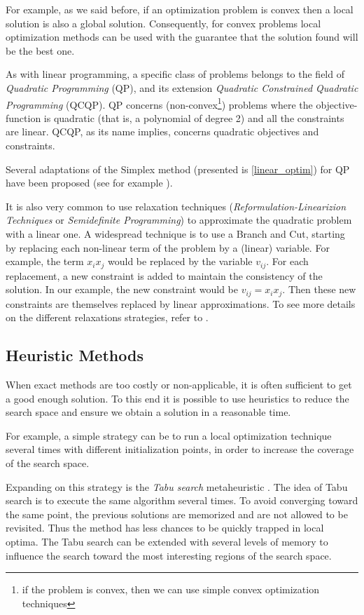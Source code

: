 For example, as we said before, if an optimization problem is convex then a local solution is also a global solution. Consequently, for convex problems local optimization methods can be used with the guarantee that the solution found will be the best one.

As with linear programming, a specific class of problems belongs to the field of \emph{Quadratic Programming} (QP), and its extension \emph{Quadratic Constrained Quadratic Programming} (QCQP). QP concerns (non-convex\footnote{if the problem is convex, then we can use simple convex optimization techniques}) problems where the objective-function is quadratic (that is, a polynomial of degree 2) and all the constraints are linear. QCQP, as its name implies, concerns quadratic objectives and constraints.

Several adaptations of the Simplex method (presented is \ref{linear_optim}) for QP have been proposed (see for example \cite{wolfe1959simplex, dantzig1998linear, van1964simplicial}).

It is also very common to use relaxation techniques (\emph{Reformulation-Linearizion Techniques} or \emph{Semidefinite Programming}) to approximate the quadratic problem with a linear one. A widespread technique is to use a Branch and Cut, starting by replacing each non-linear term of the problem by a (linear) variable. For example, the term $x_ix_j$ would be replaced by the variable $v_{ij}$. For each replacement, a new constraint is added to maintain the consistency of the solution. In our example, the new constraint would be $v_{ij} = x_ix_j$. Then these new constraints are themselves replaced by linear approximations.
To see more details on the different relaxations strategies, refer to \cite{audet2000branch}.

\subsection{Heuristic Methods}\label{optim_heuristic}

When exact methods are too costly or non-applicable, it is often sufficient to get a good enough solution. To this end it is possible to use heuristics to reduce the search space and ensure we obtain a solution in a reasonable time.

For example, a simple strategy can be to run a local optimization technique several times with different initialization points, in order to increase the coverage of the search space.

Expanding on this strategy is the \emph{Tabu search} metaheuristic \cite{glover1989tabu}. The idea of Tabu search is to execute the same algorithm several times. To avoid converging toward the same point, the previous solutions are memorized and are not allowed to be revisited. Thus the method has less chances to be quickly trapped in local optima.
The Tabu search can be extended with several levels of memory to influence the search toward the most interesting regions of the search space.

